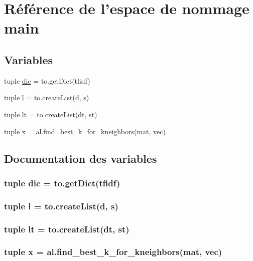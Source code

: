 \hypertarget{namespacemain}{\section{Référence de l'espace de nommage main}
\label{namespacemain}
}
\subsection*{Variables}
\begin{DoxyCompactItemize}
\item 
tuple \hyperlink{namespacemain_a3ba02571b750dd172f300851ef10228e}{dic} = to.\-get\-Dict(tfidf)
\item 
tuple \hyperlink{namespacemain_abc599b1f87ca3a4e0ff709091fb25176}{l} = to.\-create\-List(d, s)
\item 
tuple \hyperlink{namespacemain_a2187ed276d33f5f18ef29ecf5ce613ba}{lt} = to.\-create\-List(dt, st)
\item 
tuple \hyperlink{namespacemain_a7a74e6f2f6355f34b63513f77c839a9e}{x} = al.\-find\-\_\-best\-\_\-k\-\_\-for\-\_\-kneighbors(mat, vec)
\end{DoxyCompactItemize}


\subsection{Documentation des variables}
\hypertarget{namespacemain_a3ba02571b750dd172f300851ef10228e}{
\subsubsection[{dic}]{\setlength{\rightskip}{0pt plus 5cm}tuple dic = to.\-get\-Dict(tfidf)}}\label{namespacemain_a3ba02571b750dd172f300851ef10228e}
\hypertarget{namespacemain_abc599b1f87ca3a4e0ff709091fb25176}{
\subsubsection[{l}]{\setlength{\rightskip}{0pt plus 5cm}tuple l = to.\-create\-List(d, s)}}\label{namespacemain_abc599b1f87ca3a4e0ff709091fb25176}
\hypertarget{namespacemain_a2187ed276d33f5f18ef29ecf5ce613ba}{
\subsubsection[{lt}]{\setlength{\rightskip}{0pt plus 5cm}tuple lt = to.\-create\-List(dt, st)}}\label{namespacemain_a2187ed276d33f5f18ef29ecf5ce613ba}
\hypertarget{namespacemain_a7a74e6f2f6355f34b63513f77c839a9e}{
\subsubsection[{x}]{\setlength{\rightskip}{0pt plus 5cm}tuple x = al.\-find\-\_\-best\-\_\-k\-\_\-for\-\_\-kneighbors(mat, vec)}}\label{namespacemain_a7a74e6f2f6355f34b63513f77c839a9e}
